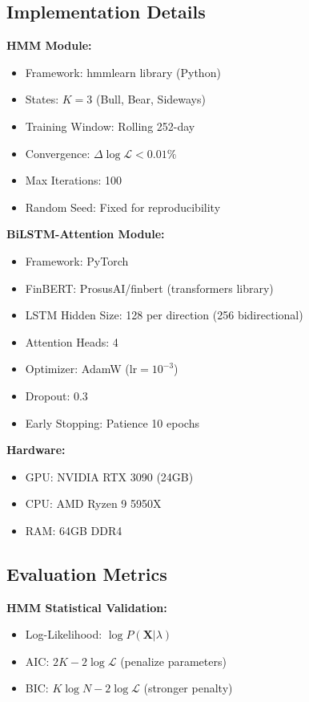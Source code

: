 \documentclass[conference]{IEEEtran}
\begin{document}
\subsection{Implementation Details}

\textbf{HMM Module:}
\begin{itemize}
\item Framework: hmmlearn library (Python)
\item States: $K=3$ (Bull, Bear, Sideways)
\item Training Window: Rolling 252-day
\item Convergence: $\Delta\log\mathcal{L} < 0.01\%$
\item Max Iterations: 100
\item Random Seed: Fixed for reproducibility
\end{itemize}

\textbf{BiLSTM-Attention Module:}
\begin{itemize}
\item Framework: PyTorch
\item FinBERT: ProsusAI/finbert (transformers library)
\item LSTM Hidden Size: 128 per direction (256 bidirectional)
\item Attention Heads: 4
\item Optimizer: AdamW ($\text{lr}=10^{-3}$)
\item Dropout: 0.3
\item Early Stopping: Patience 10 epochs
\end{itemize}

\textbf{Hardware:}
\begin{itemize}
\item GPU: NVIDIA RTX 3090 (24GB)
\item CPU: AMD Ryzen 9 5950X
\item RAM: 64GB DDR4
\end{itemize}

\subsection{Evaluation Metrics}

\textbf{HMM Statistical Validation:}
\begin{itemize}
\item Log-Likelihood: $\log P(\mathbf{X}|\lambda)$
\item AIC: $2K - 2\log\mathcal{L}$ (penalize parameters)
\item BIC: $K\log N - 2\log\mathcal{L}$ (stronger penalty)
\end{itemize}
\end{document}
